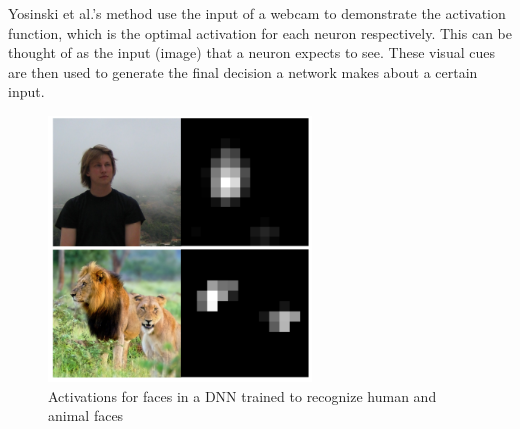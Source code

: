 \documentclass{acmsiggraph}               %
\begin{document}
Yosinski et al.'s method use the input of a webcam to demonstrate the activation function, which is the optimal activation for each neuron respectively. This can be thought of as the input (image) that a neuron expects to see. These visual cues are then used to generate the final decision a network makes about a certain input.

\begin{figure}[H]
\includegraphics[width=2.75in]{detection_yosinski_et_al}
\caption{Activations for faces in a DNN trained to recognize human and animal faces \protect\cite{Yosinski2015}}
\label{fig:face_detection}
\centering
\end{figure}
\end{document}
